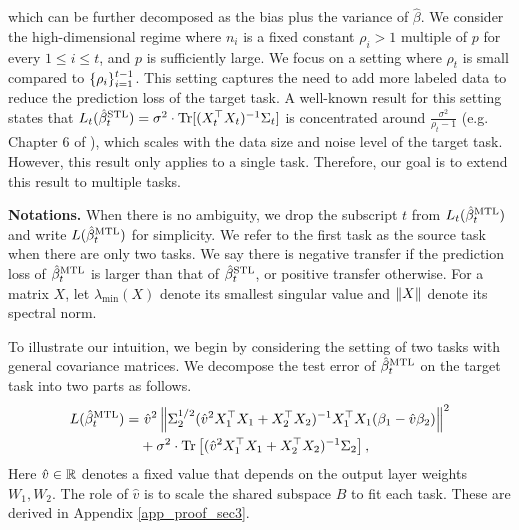 which can be further decomposed as the bias plus the variance of $\hat{\beta}$.
We consider the high-dimensional regime where $n_i$ is a fixed constant $\rho_i > 1$  multiple of $p$ for every $1\le i\le t$, and $p$ is sufficiently large.
We focus on a setting where $\rho_t$ is small compared to $\{\rho_i\}_{i=1}^{t-1}$.
This setting captures the need to add more labeled data to reduce the prediction loss of the target task.
A well-known result for this setting states that $L_t(\hat{\beta}_t^{\text{STL}}) = \sigma^2 \cdot \operatorname{Tr}[(X_t^{\top}X_t)^{-1}\Sigma_t]$ is concentrated around $\frac {\sigma^2} {\rho_t - 1}$ (e.g. Chapter 6 of \cite{S07}), which scales with the data size and noise level of the target task.
However, this result only applies to a single task.
Therefore, our goal is to extend this result to multiple tasks.

\textbf{Notations.}
When there is no ambiguity, we drop the subscript $t$ from $L_t(\hat{\beta}_t^{\text{MTL}})$ and write $L(\hat{\beta}_t^{\text{MTL}})$ for simplicity.
We refer to the first task as the source task when there are only two tasks.
We say there is negative transfer if the prediction loss of $\hat{\beta}_t^{\text{MTL}}$ is larger than that of $\hat{\beta}_t^{\text{STL}}$, or positive transfer otherwise.
For a matrix $X$, let $\lambda_{\min}(X)$ denote its smallest singular value and $\|X\|$ denote its spectral norm.


To illustrate our intuition, we begin by considering the setting of two tasks with general covariance matrices.
We decompose the test error of $\hat{\beta}_{t}^{\text{MTL}}$ on the target task into two parts as follows.
\begin{align}
	L(\hat{\beta}_t^{\text{MTL}}) =& ~ \hat{v}^2 \left\| \Sigma_2^{1/2} (\hat{v}^2 X_1^{\top}X_1 + X_2^{\top}X_2)^{-1}X_1^{\top}X_1 (\beta_1 - \hat{v}\beta_2) \right\|^2 \label{eq_te_model_shift} \\
	&+ \sigma^2\cdot \operatorname{Tr}\left[(\hat{v}^2 X_1^{\top}X_1 + X_2^{\top}X_2)^{-1}\Sigma_2\right], \label{eq_te_var}
\end{align}
Here $\hat{v}\in\mathbb{R}$ denotes a fixed value that depends on the output layer weights $W_1, W_2$.
The role of $\hat{v}$ is to scale the shared subspace $B$ to fit each task.
These are derived in Appendix \ref{app_proof_sec3}.

